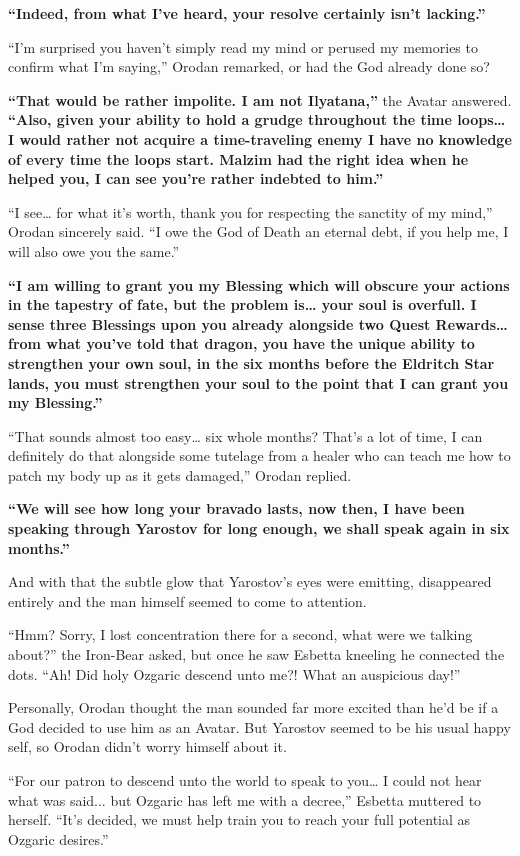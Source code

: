 \documentclass[a4paper,10pt]{book}
\begin{document}
\textbf{“Indeed, from what I’ve heard, your resolve certainly isn’t lacking.”}\par
“I’m surprised you haven’t simply read my mind or perused my memories to confirm what I’m saying,” Orodan remarked, or had the God already done so?\par
\textbf{“That would be rather impolite. I am not Ilyatana,” }the Avatar answered. \textbf{“Also, given your ability to hold a grudge throughout the time loops… I would rather not acquire a time-traveling enemy I have no knowledge of every time the loops start. Malzim had the right idea when he helped you, I can see you’re rather indebted to him.”}\par
“I see… for what it’s worth, thank you for respecting the sanctity of my mind,” Orodan sincerely said. “I owe the God of Death an eternal debt, if you help me, I will also owe you the same.”\par
\textbf{“I am willing to grant you my Blessing which will obscure your actions in the tapestry of fate, but the problem is… your soul is overfull. I sense three Blessings upon you already alongside two Quest Rewards… from what you’ve told that dragon, you have the unique ability to strengthen your own soul, in the six months before the Eldritch Star lands, you must strengthen your soul to the point that I can grant you my Blessing.”}\par
“That sounds almost too easy… six whole months? That’s a lot of time, I can definitely do that alongside some tutelage from a healer who can teach me how to patch my body up as it gets damaged,” Orodan replied.\par
\textbf{“We will see how long your bravado lasts, now then, I have been speaking through Yarostov for long enough, we shall speak again in six months.”}\par
And with that the subtle glow that Yarostov’s eyes were emitting, disappeared entirely and the man himself seemed to come to attention.\par
“Hmm? Sorry, I lost concentration there for a second, what were we talking about?” the Iron-Bear asked, but once he saw Esbetta kneeling he connected the dots. “Ah! Did holy Ozgaric descend unto me?! What an auspicious day!”\par
Personally, Orodan thought the man sounded far more excited than he’d be if a God decided to use him as an Avatar. But Yarostov seemed to be his usual happy self, so Orodan didn’t worry himself about it.\par
“For our patron to descend unto the world to speak to you… I could not hear what was said... but Ozgaric has left me with a decree,” Esbetta muttered to herself. “It’s decided, we must help train you to reach your full potential as Ozgaric desires.”\par
\end{document}

